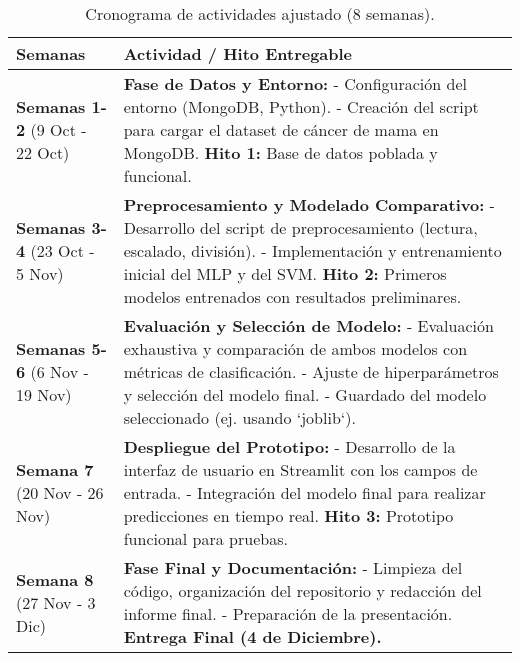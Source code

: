 \documentclass[12pt]{src/formato_utem}
\begin{document}
\begin{table}[h!]
\centering
\begin{tabular}{|l|p{9.5cm}|}
\hline
\textbf{Semanas} & \textbf{Actividad / Hito Entregable} \\ \hline
\textbf{Semanas 1-2} \newline (9 Oct - 22 Oct) & \textbf{Fase de Datos y Entorno:} \newline - Configuración del entorno (MongoDB, Python). \newline - Creación del script para cargar el dataset de cáncer de mama en MongoDB. \newline \textbf{Hito 1:} Base de datos poblada y funcional. \\ \hline

\textbf{Semanas 3-4} \newline (23 Oct - 5 Nov) & \textbf{Preprocesamiento y Modelado Comparativo:} \newline - Desarrollo del script de preprocesamiento (lectura, escalado, división). \newline - Implementación y entrenamiento inicial del MLP y del SVM. \newline \textbf{Hito 2:} Primeros modelos entrenados con resultados preliminares. \\ \hline

\textbf{Semanas 5-6} \newline (6 Nov - 19 Nov) & \textbf{Evaluación y Selección de Modelo:} \newline - Evaluación exhaustiva y comparación de ambos modelos con métricas de clasificación. \newline - Ajuste de hiperparámetros y selección del modelo final. \newline - Guardado del modelo seleccionado (ej. usando `joblib`). \\ \hline

\textbf{Semana 7} \newline (20 Nov - 26 Nov) & \textbf{Despliegue del Prototipo:} \newline - Desarrollo de la interfaz de usuario en Streamlit con los campos de entrada. \newline - Integración del modelo final para realizar predicciones en tiempo real. \newline \textbf{Hito 3:} Prototipo funcional para pruebas. \\ \hline

\textbf{Semana 8} \newline (27 Nov - 3 Dic) & \textbf{Fase Final y Documentación:} \newline - Limpieza del código, organización del repositorio y redacción del informe final. \newline - Preparación de la presentación. \newline \textbf{Entrega Final (4 de Diciembre).} \\ \hline
\end{tabular}
\caption{Cronograma de actividades ajustado (8 semanas).}
\label{tab:cronograma_ajustado}
\end{table}
\end{document}
